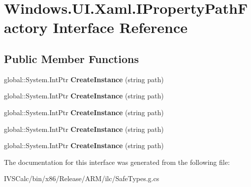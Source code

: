 \hypertarget{interface_windows_1_1_u_i_1_1_xaml_1_1_i_property_path_factory}{}\section{Windows.\+U\+I.\+Xaml.\+I\+Property\+Path\+Factory Interface Reference}
\label{interface_windows_1_1_u_i_1_1_xaml_1_1_i_property_path_factory}
\subsection*{Public Member Functions}
\begin{DoxyCompactItemize}
\item 
\mbox{\label{interface_windows_1_1_u_i_1_1_xaml_1_1_i_property_path_factory_a1b26134c7992e79a282e5fa7e231edbc}} 
global\+::\+System.\+Int\+Ptr {\bfseries Create\+Instance} (string path)
\item 
\mbox{\label{interface_windows_1_1_u_i_1_1_xaml_1_1_i_property_path_factory_a1b26134c7992e79a282e5fa7e231edbc}} 
global\+::\+System.\+Int\+Ptr {\bfseries Create\+Instance} (string path)
\item 
\mbox{\label{interface_windows_1_1_u_i_1_1_xaml_1_1_i_property_path_factory_a1b26134c7992e79a282e5fa7e231edbc}} 
global\+::\+System.\+Int\+Ptr {\bfseries Create\+Instance} (string path)
\item 
\mbox{\label{interface_windows_1_1_u_i_1_1_xaml_1_1_i_property_path_factory_a1b26134c7992e79a282e5fa7e231edbc}} 
global\+::\+System.\+Int\+Ptr {\bfseries Create\+Instance} (string path)
\item 
\mbox{\label{interface_windows_1_1_u_i_1_1_xaml_1_1_i_property_path_factory_a1b26134c7992e79a282e5fa7e231edbc}} 
global\+::\+System.\+Int\+Ptr {\bfseries Create\+Instance} (string path)
\end{DoxyCompactItemize}


The documentation for this interface was generated from the following file\+:\begin{DoxyCompactItemize}
\item 
I\+V\+S\+Calc/bin/x86/\+Release/\+A\+R\+M/ilc/Safe\+Types.\+g.\+cs\end{DoxyCompactItemize}
